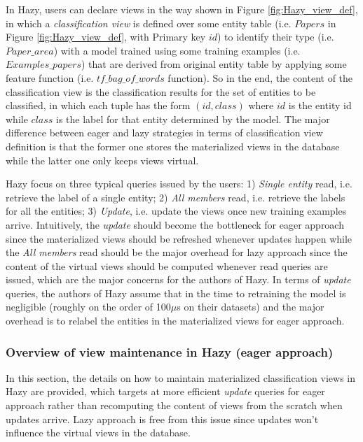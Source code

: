 In Hazy, users can declare views in the way shown in Figure \ref{fig:Hazy_view_def}, in which a {\em classification view} is defined over some entity table (i.e. $Papers$ in Figure \ref{fig:Hazy_view_def}, with Primary key $id$) to identify their type (i.e. $Paper\_area$) with a model trained using some training examples (i.e. $Examples\_papers$) that are derived from original entity table by applying some feature function (i.e. $tf\_bag\_of\_words$ function). So in the end, the content of the classification view is the classification results for the set of entities to be classified, in which each tuple has the form $(id, class)$ where $id$ is the entity id while $class$ is the label for that entity determined by the model. The major difference between eager and lazy strategies in terms of classification view definition is that the former one stores the materialized views in the database while the latter one only keeps views virtual.

Hazy focus on three typical queries issued by the users: 1) {\em Single entity} read, i.e. retrieve the label of a single entity; 2) {\em All members} read, i.e. retrieve the labels for all the entities; 3) {\em Update}, i.e. update the views once new training examples arrive. Intuitively, the {\em update} should become the bottleneck for eager approach since the materialized views should be refreshed whenever updates happen while the {\em All members} read should be the major overhead for lazy approach since the content of the virtual views should be computed whenever read queries are issued, which are the major concerns for the authors of Hazy. In terms of {\em update} queries, the authors of Hazy assume that in the time to retraining the model is negligible (roughly on the order of 100$\mu$s on their datasets) and the major overhead is to relabel the entities in the materialized views for eager approach. 

\subsubsection{Overview of view maintenance in Hazy (eager approach)}
In this section, the details on how to maintain materialized classification views in Hazy are provided, which targets at more efficient {\em update} queries for eager approach rather than recomputing the content of views from the scratch when updates arrive. Lazy approach is free from this issue since updates won't influence the virtual views in the database. 

